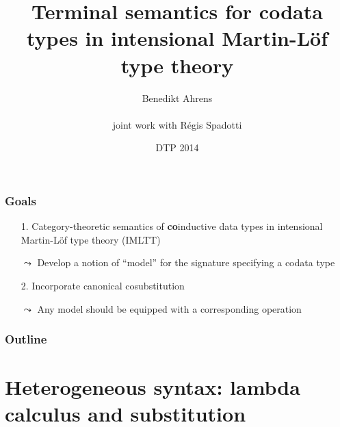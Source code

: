 \documentclass[
]
{beamer}
\title[Terminal semantics for codata in IMLTT]{Terminal semantics for codata types in intensional Martin-Löf type theory}
\author[B.\ Ahrens and R.\ Spadotti]{Benedikt Ahrens \\~\\ joint work with R\'egis Spadotti}
\date[2014-07-13]{DTP 2014}
\institute[IRIT] %
{%
  Institut de Recherche en Informatique de Toulouse\\
   Universit\'e Paul Sabatier\\ ~ \\
}
\newcommand{\fat}[1]{\textbf{#1}}
\begin{document}
\begin{frame}
 \titlepage
\end{frame}


\begin{frame}
 \frametitle{Goals}
 
   \begin{itemize}\setlength{\itemsep}{1em}
    \item [1.]Category-theoretic semantics of \fat{co}inductive data types
          in intensional Martin-L\"of type theory (IMLTT)
    \item [$\leadsto$] Develop a notion of \enquote{model} for the signature specifying a codata type
    \item [2.] Incorporate canonical cosubstitution
    \item [$\leadsto$] Any model should be equipped with a corresponding operation
   \end{itemize}


 
\end{frame}


\begin{frame}
 \frametitle{Outline}
 \tableofcontents
\end{frame}


\section{Heterogeneous syntax: lambda calculus and substitution}

\begin{comment}
\begin{frame}
 \frametitle{Starting point: W-types in Martin-L\"of TT}
 
  
 \begin{block}{Well-founded trees as \fat{initial algebra} of polynomial functor}
 
  \begin{itemize}
   \item Trees specified by $A$ and $x:A\vdash B(x)$
   
   \item Type of natural numbers $\mathbb{N} := W~A~B$ with: \[A = \{O,S\}, \quad B(O) = \{\}, \quad B(S)=\{*\}\]
 
   \item The type $W~A~B$ is the (carrier of) the initial algebra of
    \[X \mapsto \sum_{a:A}X^{B(a)} \]
 
 
   
   \item Dybjer '97, Moerdijk and Palmgren '00
  \end{itemize}
 \end{block}
\end{frame}
\end{comment}
\end{document}
